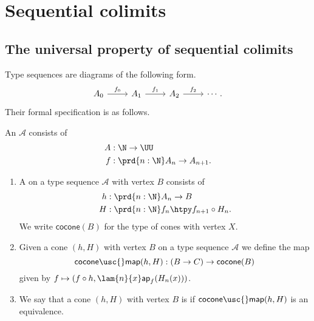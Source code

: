 \chapter{Sequential colimits}

\section{The universal property of sequential colimits}

Type sequences are diagrams of the following form.
\begin{equation*}
\begin{tikzcd}
A_0 \arrow[r,"f_0"] & A_1 \arrow[r,"f_1"] & A_2 \arrow[r,"f_2"] & \cdots.
\end{tikzcd}
\end{equation*}
Their formal specification is as follows.

\begin{defn}
An  $\mathcal{A}$ consists of
\begin{align*}
A & : \N\to\UU \\
f & : \prd{n:\N} A_n\to A_{n+1}. 
\end{align*}
\end{defn}

\begin{defn}
\begin{enumerate}
\item A  on a type sequence $\mathcal{A}$ with vertex $B$ consists of
\begin{align*}
h & : \prd{n:\N} A_n\to B \\
H & : \prd{n:\N} f_n\htpy f_{n+1}\circ H_n.
\end{align*}
We write $\mathsf{cocone}(B)$ for the type of cones with vertex $X$.
\item Given a cone $(h,H)$ with vertex $B$ on a type sequence $\mathcal{A}$ we define the map
\begin{equation*}
\mathsf{cocone\usc{}map}(h,H) : (B\to C)\to \mathsf{cocone}(B)
\end{equation*}
given by $f\mapsto (f\circ h,\lam{n}{x}\mathsf{ap}_f(H_n(x)))$. 
\item We say that a cone $(h,H)$ with vertex $B$ is  if $\mathsf{cocone\usc{}map}(h,H)$ is an equivalence.
\end{enumerate}
\end{defn}

